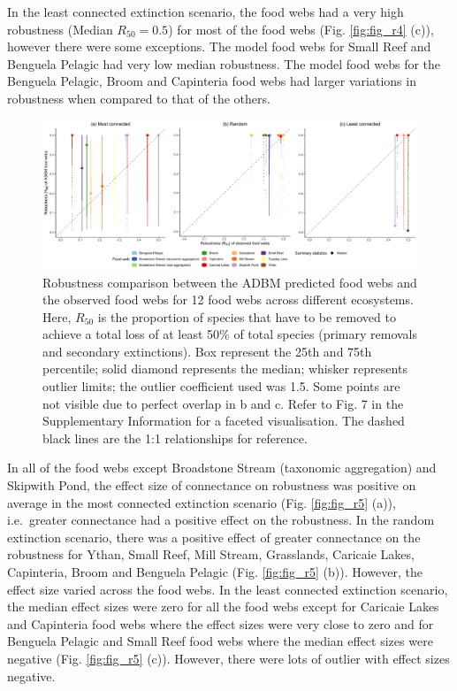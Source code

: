 \documentclass{article}
\begin{document}
In the least connected extinction scenario, the food webs had a very
high robustness (Median \(R_{50} = 0.5\)) for most of the food webs
(Fig. \ref{fig:fig_r4} (c)), however there were some exceptions. The
model food webs for Small Reef and Benguela Pelagic had very low median
robustness. The model food webs for the Benguela Pelagic, Broom and
Capinteria food webs had larger variations in robustness when compared
to that of the others.

\begin{figure}

{\centering \includegraphics[width=450px]{../results/plot_R50_ADBM_vs_obs} 

}

\caption{\label{fig:fig_r4} Robustness comparison between the ADBM predicted food webs and the observed food webs for 12 food webs across different ecosystems. Here, $R_{50}$ is the proportion of species that have to be removed to achieve a total loss of at least 50\% of total species (primary removals and secondary extinctions). Box represent the 25th and 75th percentile; solid diamond represents the median; whisker represents outlier limits; the outlier coefficient used was 1.5. Some points are not visible due to perfect overlap in b and c. Refer to Fig. 7 in the Supplementary Information for a faceted visualisation. The dashed black lines are the 1:1 relationships for reference.}\label{fig:unnamed-chunk-2}
\end{figure}

In all of the food webs except Broadstone Stream (taxonomic aggregation)
and Skipwith Pond, the effect size of connectance on robustness was
positive on average in the most connected extinction scenario (Fig.
\ref{fig:fig_r5} (a)), i.e.~greater connectance had a positive effect on
the robustness. In the random extinction scenario, there was a positive
effect of greater connectance on the robustness for Ythan, Small Reef,
Mill Stream, Grasslands, Caricaie Lakes, Capinteria, Broom and Benguela
Pelagic (Fig. \ref{fig:fig_r5} (b)). However, the effect size varied
across the food webs. In the least connected extinction scenario, the
median effect sizes were zero for all the food webs except for Caricaie
Lakes and Capinteria food webs where the effect sizes were very close to
zero and for Benguela Pelagic and Small Reef food webs where the median
effect sizes were negative (Fig. \ref{fig:fig_r5} (c)). However, there
were lots of outlier with effect sizes negative.
\end{document}
